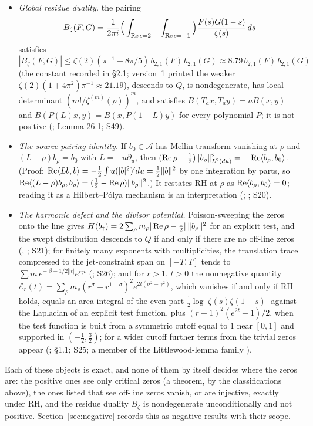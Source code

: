 \begin{itemize}
\item \emph{Global residue duality.} the pairing
\[
B_\zeta(F,G)=\frac1{2\pi i}\Big(\int_{\operatorname{Re} s=2}-\int_{\operatorname{Re} s=-1}\Big)\frac{F(s)G(1-s)}{\zeta(s)}\,ds
\]
satisfies $|B_\zeta(F,G)|\le\zeta(2)(\pi^{-1}+8\pi/5)\,b_{2,1}(F)\,b_{2,1}(G)\approx8.79\,b_{2,1}(F)\,b_{2,1}(G)$ (the constant recorded in  §2.1; version~1 printed the weaker $\zeta(2)(1+4\pi^2)\pi^{-1}\approx21.19$), descends to $Q$, is nondegenerate, has local determinant $(m!/\zeta^{(m)}(\rho))^m$, and satisfies $B(T_ax,T_ay)=aB(x,y)$ and $B(P(L)x,y)=B(x,P(1-L)y)$ for every polynomial $P$; it is not positive (;  Lemma 26.1; S49).
\item \emph{The source-pairing identity.} If $b_0\in\mathcal{A}$ has Mellin transform vanishing at $\rho$ and $(L-\rho)b_\rho=b_0$ with $L=-u\partial_u$, then $(\operatorname{Re}\rho-\tfrac12)\|b_\rho\|^2_{L^2(du)}=-\operatorname{Re}\langle b_\rho,b_0\rangle$. (Proof: $\operatorname{Re}\langle Lb,b\rangle=-\tfrac12\int u(|b|^2)'du=\tfrac12\|b\|^2$ by one integration by parts, so $\operatorname{Re}\langle(L-\rho)b_\rho,b_\rho\rangle=(\tfrac12-\operatorname{Re}\rho)\|b_\rho\|^2$.) It restates RH at $\rho$ as $\operatorname{Re}\langle b_\rho,b_0\rangle=0$; reading it as a Hilbert--Pólya mechanism is an interpretation (; ; S20).
\item \emph{The harmonic defect and the divisor potential.} Poisson-sweeping the zeros onto the line gives $H(b_\dagger)=2\sum_\rho m_\rho|\operatorname{Re}\rho-\tfrac12|\,\|b_\rho\|^2$ for an explicit test, and the swept distribution descends to $Q$ if and only if there are no off-line zeros (, ; S21); for finitely many exponents with multiplicities, the translation trace compressed to the jet-constraint span on $[-T,T]$ tends to $\sum m\,e^{-|\beta-1/2||t|}e^{i\gamma t}$ (; S26); and for $r>1$, $t>0$ the nonnegative quantity $\mathcal{E}_r(t)=\sum_\rho m_\rho(r^\sigma-r^{1-\sigma})^2e^{2t(\sigma^2-\gamma^2)}$, which vanishes if and only if RH holds, equals an area integral of the even part $\tfrac12\log|\zeta(s)\zeta(1-\bar s)|$ against the Laplacian of an explicit test function, plus $(r-1)^2(e^{2t}+1)/2$, when the test function is built from a symmetric cutoff equal to $1$ near $[0,1]$ and supported in $(-\tfrac12,\tfrac32)$; for a wider cutoff further terms from the trivial zeros appear (;  §1.1; S25; a member of the Littlewood-lemma family \cite{BalazardSaiasYor,SekatskiiBeltraminelliMerlini}).
\end{itemize}
Each of these objects is exact, and none of them by itself decides where the zeros are: the positive ones see only critical zeros (a theorem, by the classifications above), the ones listed that see off-line zeros vanish, or are injective, exactly under RH, and the residue duality $B_\zeta$ is nondegenerate unconditionally and not positive. Section~\ref{sec:negative} records this as negative results with their scope.
